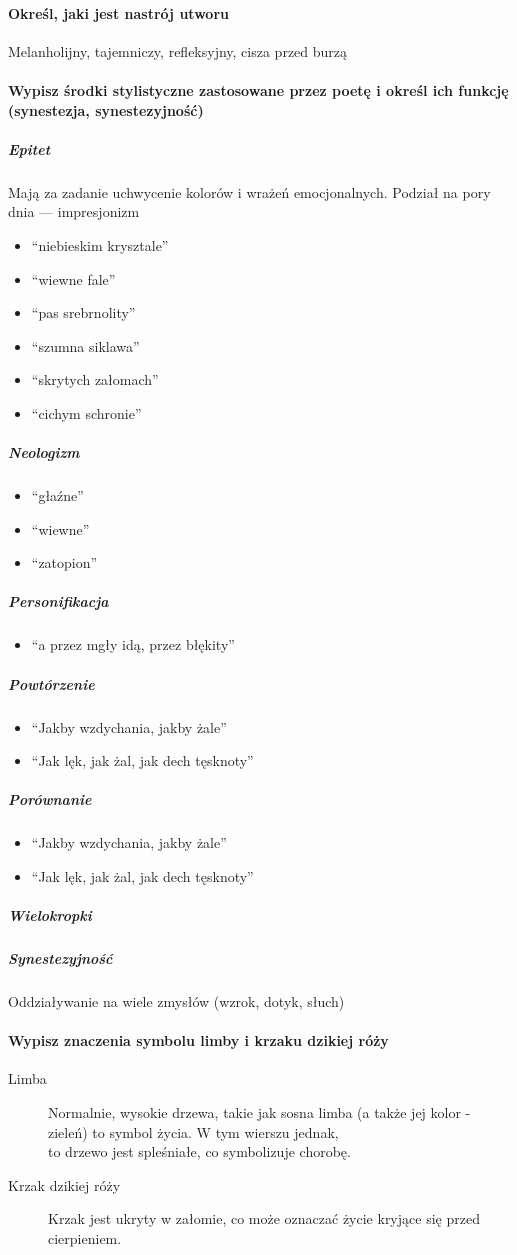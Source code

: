 \documentclass{article}
\begin{document}
\paragraph{Określ, jaki jest nastrój utworu}
Melanholijny, tajemniczy, refleksyjny, cisza przed burzą
\paragraph{Wypisz środki stylistyczne zastosowane przez poetę i określ ich funkcję (synestezja, synestezyjność)}
\subparagraph{Epitet}
Mają za zadanie uchwycenie kolorów i wrażeń emocjonalnych. Podział na pory dnia --- impresjonizm
\begin{itemize}
    \item ``niebieskim krysztale''
    \item ``wiewne fale''
    \item ``pas srebrnolity''
    \item ``szumna siklawa''
    \item ``skrytych załomach''
    \item ``cichym schronie''
\end{itemize}
\subparagraph{Neologizm}
\begin{itemize}
    \item ``głaźne''
    \item ``wiewne''
    \item ``zatopion''
\end{itemize}
\subparagraph{Personifikacja}
\begin{itemize}
    \item ``a przez mgły idą, przez błękity''
\end{itemize}
\subparagraph{Powtórzenie}
\begin{itemize}
    \item ``Jakby wzdychania, jakby żale''
    \item ``Jak lęk, jak żal, jak dech tęsknoty''
\end{itemize}
\subparagraph{Porównanie}
\begin{itemize}
    \item ``Jakby wzdychania, jakby żale''
    \item ``Jak lęk, jak żal, jak dech tęsknoty''
\end{itemize}
\subparagraph{Wielokropki}
\subparagraph{Synestezyjność}
Oddziaływanie na wiele zmysłów (wzrok, dotyk, słuch)

\paragraph{Wypisz znaczenia symbolu limby i krzaku dzikiej róży}
\begin{description}
    \item[Limba] Normalnie, wysokie drzewa, takie jak sosna limba (a także jej kolor - zieleń) to symbol życia. W tym wierszu jednak, \\
to drzewo jest spleśniałe, co symbolizuje chorobę.
    \item[Krzak dzikiej róży] Krzak jest ukryty w załomie, co może oznaczać życie kryjące się przed cierpieniem.
\end{description}
\end{document}
